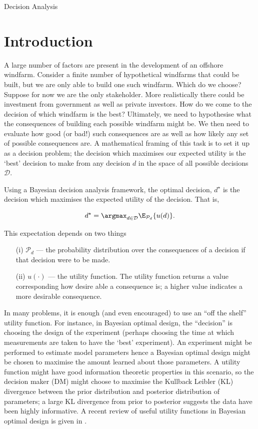 \begin{chapter}{Decision Analysis \label{Ch:decision}}
\section{Introduction}
A large number of factors are present in the development of an offshore windfarm. Consider a finite number of hypothetical windfarms that could be built, but we are only able to build one such windfarm. Which do we choose? Suppose for now we are the only stakeholder. More realistically there could be investment from government as well as private investors. How do we come to the decision of which windfarm is the best? Ultimately, we need to hypothesise what the consequences of building each possible windfarm might be. We then need to evaluate how good (or bad!) such consequences are as well as how likely any set of possible consequences are. A mathematical framing of this task is to set it up as a decision problem; the decision which maximises our expected utility is the `best' decision to make from any decision $d$ in the space of all possible decisions $\mathcal{D}$.

Using a Bayesian decision analysis framework, the optimal decision, $d^\star$ is the decision which maximises the expected utility of the decision. That is,

\begin{equation}
d^\star = \argmax_{d \in \mathcal{D}} \E_{\mathcal{P}_d} \{u(d)\}. \label{Eq:optimal-decision}
\end{equation}

This expectation depends on two things
\begin{enumerate}
	\item[(i)] $\mathcal{P}_d$ --- the probability distribution over the consequences of a decision if that decision were to be made.
	\item[(ii)] $u(\cdot)$ --- the utility function. The utility function returns a value corresponding how desire able a consequence is; a higher value indicates a more desirable consequence.
\end{enumerate}

In many problems, it is enough (and even encouraged) to use an ``off the shelf'' utility function. For instance, in Bayesian optimal design, the ``decision'' is choosing the design of the experiment (perhaps choosing the time at which measurements are taken to have the `best' experiment). An experiment might be performed to estimate model parameters hence a Bayesian optimal design might be chosen to maximise the amount learned about those parameters. A utility function might have good information theoretic properties in this scenario, so the decision maker (DM) might choose to maximise the Kullback Leibler (KL) divergence between the prior distribution and posterior distribution of parameters; a large KL divergence from prior to posterior suggests the data have been highly informative. A recent review of useful utility functions in Bayesian optimal design is given in \citet{Ryan2016}.


\end{chapter}
